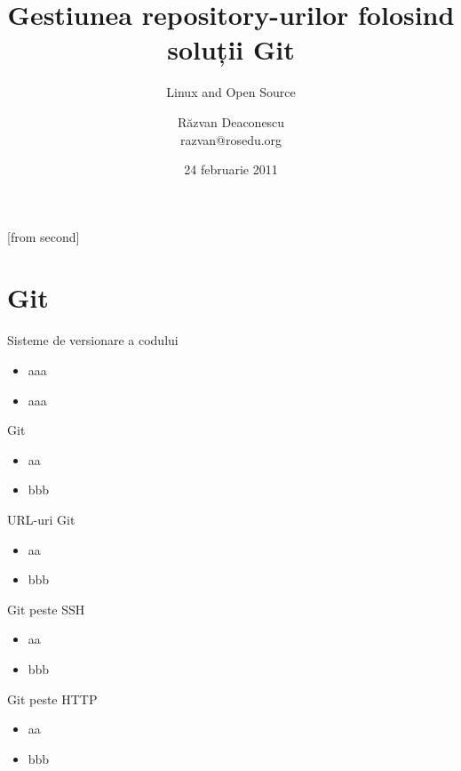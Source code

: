 \documentclass{beamer}
\title[Git Repositories]{Gestiunea repository-urilor folosind soluții Git}
\subtitle{Linux and Open Source}
\author[Răzvan Deaconescu]{Răzvan Deaconescu\\
	razvan@rosedu.org}
\date{24 februarie 2011}
\begin{document}
[from second]


\frame{\titlepage}

\frame{\tableofcontents}

\section{Git}

\begin{frame}{Sisteme de versionare a codului}
	\begin{itemize}		%
		\item aaa
		\item aaa
	\end{itemize}
\end{frame}

\begin{frame}{Git}
	\begin{itemize}
		\item aa
		\item bbb
	\end{itemize}
\end{frame}

\begin{frame}{URL-uri Git}
	\begin{itemize}
		\item aa
		\item bbb
	\end{itemize}
\end{frame}

\begin{frame}{Git peste SSH}
	\begin{itemize}
		\item aa
		\item bbb
	\end{itemize}
\end{frame}

\begin{frame}{Git peste HTTP}
	\begin{itemize}
		\item aa
		\item bbb
	\end{itemize}
\end{frame}
\end{document}
